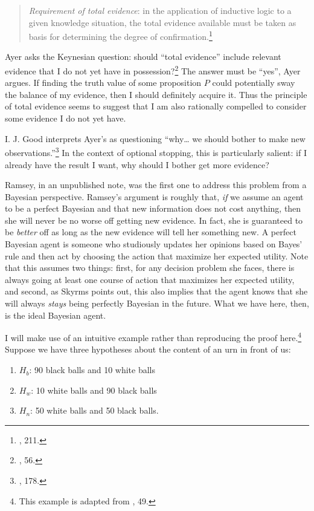 \begin{quote}
\emph{Requirement of total evidence}: in the application of inductive
logic to a given knowledge situation, the total evidence available must
be taken as basis for determining the degree of confirmation.\footnote{\cite{carnapprob}, 211.}
\end{quote}

Ayer asks the Keynesian question: should ``total evidence'' include
relevant evidence that I do not yet have in possession?\footnote{\cite{ayerpae}, 56.} The
answer must be ``yes'', Ayer argues. If finding the truth value of some
proposition \(P\) could potentially sway the balance of my evidence,
then I should definitely acquire it. Thus the principle of total
evidence seems to suggest that I am also rationally compelled to
consider some evidence I do not yet have.

I. J. Good interprets Ayer's as questioning ``why\ldots{} we should
bother to make new observations.''\footnote{\cite{goodthinking}, 178.} In the context of optional stopping, this
is particularly salient: if I already have the result I want, why should
I bother get more evidence?

Ramsey, in an unpublished note, was the first one to address this
problem from a Bayesian perspective. Ramsey's argument is roughly that,
\emph{if} we assume an agent to be a perfect Bayesian and that new
information does not cost anything, then she will never be no worse off
getting new evidence. In fact, she is guaranteed to be \emph{better} off
as long as the new evidence will tell her something new. A perfect
Bayesian agent is someone who studiously updates her opinions based on
Bayes' rule and then act by choosing the action that maximize her
expected utility. Note that this assumes two things: first, for any
decision problem she faces, there is always going at least one course of
action that maximizes her expected utility, and second, as Skyrms points
out, this also implies that the agent knows that she will always
\emph{stays} being perfectly Bayesian in the future. What we have here,
then, is the ideal Bayesian agent.

I will make use of an intuitive example rather than reproducing the
proof here.\footnote{This example is adapted from \cite{leviweight}, 49.} Suppose we have
three hypotheses about the content of an urn in front of us:

\begin{enumerate}
\def\labelenumi{\arabic{enumi}.}
\tightlist
\item
  \(H_b\): 90 black balls and 10 white balls
\item
  \(H_w\): 10 white balls and 90 black balls
\item
  \(H_n\): 50 white balls and 50 black balls.
\end{enumerate}

